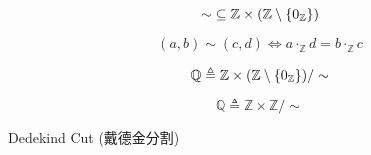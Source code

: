 \begin{frame}{}
  \begin{definition}
    \[
      \sim\; \subseteq \mathbb{Z} \times (\mathbb{Z} \setminus \{0_{\mathbb{Z}}\})
    \]

    \[
      (a, b) \sim (c, d) \iff a \cdot_{\mathbb{Z}} d = b \cdot_{\mathbb{Z}} c
    \]
  \end{definition}

  \pause
  \vspace{0.30cm}
  \begin{definition}[$\mathbb{Q}$]
    \[
      \mathbb{Q} \triangleq \mathbb{Z} \times (\mathbb{Z} \setminus \{0_{\mathbb{Z}}\})/\sim
    \]
  \end{definition}
\end{frame}

\begin{frame}{}
  \[
    \mathbb{Q} \triangleq \mathbb{Z} \times \mathbb{Z}/\sim
  \]
\end{frame}

\begin{frame}{}
  \begin{center}
  \end{center}

  \pause
  \begin{center}
    Dedekind Cut (戴德金分割)
  \end{center}
\end{frame}
